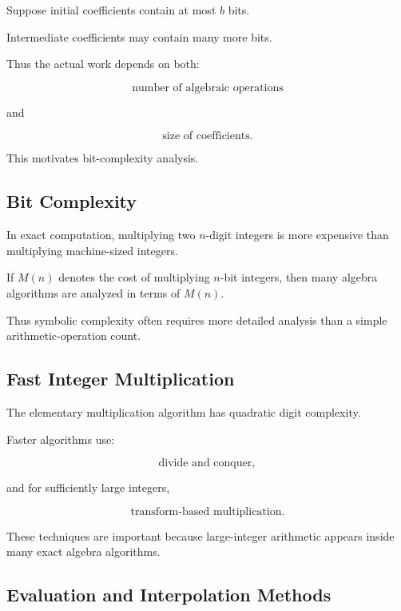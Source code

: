 Suppose initial coefficients contain at most \(b\) bits.

Intermediate coefficients may contain many more bits.

Thus the actual work depends on both:

\[
\boxed{
\text{number of algebraic operations}
}
\]

and

\[
\boxed{
\text{size of coefficients}.
}
\]

This motivates bit-complexity analysis.

\subsection{Bit Complexity}
\label{subsec:computer-algebra-bit-complexity}

In exact computation, multiplying two \(n\)-digit integers is more
expensive than multiplying machine-sized integers.

If \(M(n)\) denotes the cost of multiplying \(n\)-bit integers, then many
algebra algorithms are analyzed in terms of \(M(n)\).

Thus symbolic complexity often requires more detailed analysis than a
simple arithmetic-operation count.

\subsection{Fast Integer Multiplication}
\label{subsec:fast-integer-multiplication}

The elementary multiplication algorithm has quadratic digit complexity.

Faster algorithms use:

\[
\boxed{
\text{divide and conquer},
}
\]

and for sufficiently large integers,

\[
\boxed{
\text{transform-based multiplication}.
}
\]

These techniques are important because large-integer arithmetic appears
inside many exact algebra algorithms.

\subsection{Evaluation and Interpolation Methods}
\label{subsec:evaluation-interpolation-computer-algebra}

